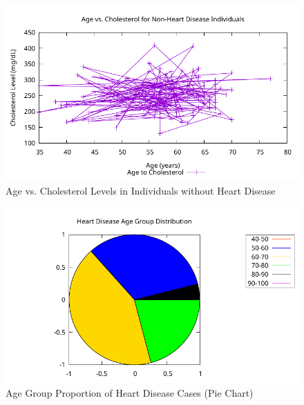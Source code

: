 \documentclass{article}
\begin{document}
	\begin{figure}[H]
		\centering
		\includegraphics[scale=0.7]{no_heart_chol_chart.pdf}
		\caption{Age vs. Cholesterol Levels in Individuals without Heart Disease}
		\label{fig:age_chol_no_disease}
	\end{figure}
	
	\begin{figure}[H]
		\centering
		\includegraphics[scale=0.7]{age_distribution_pie.pdf}
		\caption{Age Group Proportion of Heart Disease Cases (Pie Chart)}
		\label{fig:age_disease_pie}
	\end{figure}
	
\end{document}

